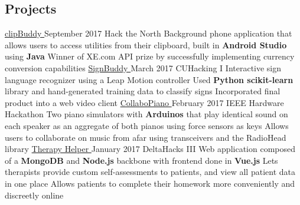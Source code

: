 \documentclass[]{aanguyen_res}
\begin{document}
\begin{main}
		\section{Projects}
			\vspace{0.1cm}%
			\mainentry%
				{\href{https://github.com/kumailn/clipBuddy}{clipBuddy {\faGithub}}}%
				{September 2017}%
				{Hack the North}%
				{}%
				{\faCaretRight Background phone application that allows users to access utilities from their clipboard, built in \textbf{Android Studio} using \textbf{Java}
				\faCaretRight Winner of XE.com API prize by successfully implementing currency conversion capabilities}
			\vspace{0.1cm}%
			\mainentry%
				{\href{https://github.com/aanguyen/SignBuddy}{SignBuddy {\faGithub}}}%
				{March 2017}%
				{CUHacking I}%
				{}%
				{\faCaretRight Interactive sign language recognizer using a Leap Motion controller 
				\faCaretRight Used \textbf{Python scikit-learn} library and hand-generated training data to classify signs
				\faCaretRight Incorporated final product into a web video client}
			\vspace{0.1cm}%
			\mainentry%
				{\href{https://github.com/aanguyen/collaboPiano}{CollaboPiano {\faGithub}}}%
				{February 2017}%
				{IEEE Hardware Hackathon}%
				{}%
				{\faCaretRight Two piano simulators with \textbf{Arduinos} that play identical sound on each speaker as an aggregate of both pianos using force sensors as keys
				\faCaretRight Allows users to collaborate on music from afar using transceivers and the RadioHead library}
			\vspace{0.1cm}%
			\mainentry%
				{\href{https://github.com/dtong1113/TherapyHelper}{Therapy Helper {\faGithub}}}%
				{January 2017}%
				{DeltaHacks III}%
				{}%
				{\faCaretRight Web application composed of a \textbf{MongoDB} and \textbf{Node.js} backbone with frontend done in \textbf{Vue.js}
				\faCaretRight Lets therapists provide custom self-assessments to patients, and view all patient data in one place
				\faCaretRight Allows patients to complete their homework more conveniently and discreetly online}

\end{main}
\end{document}
